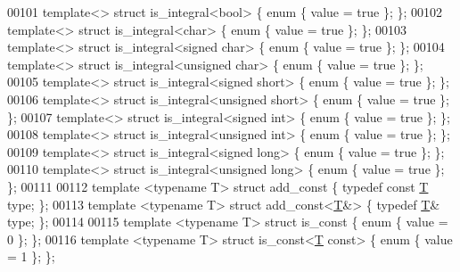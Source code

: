 \begin{DoxyCode}
00101 \textcolor{keyword}{template}<> \textcolor{keyword}{struct }is\_integral<bool>            \{ \textcolor{keyword}{enum} \{ value = \textcolor{keyword}{true} \}; \};
00102 \textcolor{keyword}{template}<> \textcolor{keyword}{struct }is\_integral<char>            \{ \textcolor{keyword}{enum} \{ value = \textcolor{keyword}{true} \}; \};
00103 \textcolor{keyword}{template}<> \textcolor{keyword}{struct }is\_integral<signed char>     \{ \textcolor{keyword}{enum} \{ value = \textcolor{keyword}{true} \}; \};
00104 \textcolor{keyword}{template}<> \textcolor{keyword}{struct }is\_integral<unsigned char>   \{ \textcolor{keyword}{enum} \{ value = \textcolor{keyword}{true} \}; \};
00105 \textcolor{keyword}{template}<> \textcolor{keyword}{struct }is\_integral<signed short>    \{ \textcolor{keyword}{enum} \{ value = \textcolor{keyword}{true} \}; \};
00106 \textcolor{keyword}{template}<> \textcolor{keyword}{struct }is\_integral<unsigned short>  \{ \textcolor{keyword}{enum} \{ value = \textcolor{keyword}{true} \}; \};
00107 \textcolor{keyword}{template}<> \textcolor{keyword}{struct }is\_integral<signed int>      \{ \textcolor{keyword}{enum} \{ value = \textcolor{keyword}{true} \}; \};
00108 \textcolor{keyword}{template}<> \textcolor{keyword}{struct }is\_integral<unsigned int>    \{ \textcolor{keyword}{enum} \{ value = \textcolor{keyword}{true} \}; \};
00109 \textcolor{keyword}{template}<> \textcolor{keyword}{struct }is\_integral<signed long>     \{ \textcolor{keyword}{enum} \{ value = \textcolor{keyword}{true} \}; \};
00110 \textcolor{keyword}{template}<> \textcolor{keyword}{struct }is\_integral<unsigned long>   \{ \textcolor{keyword}{enum} \{ value = \textcolor{keyword}{true} \}; \};
00111 
00112 \textcolor{keyword}{template} <\textcolor{keyword}{typename} T> \textcolor{keyword}{struct }add\_const \{ \textcolor{keyword}{typedef} \textcolor{keyword}{const} \hyperlink{group___sparse_core___module_class_eigen_1_1_triplet}{T} type; \};
00113 \textcolor{keyword}{template} <\textcolor{keyword}{typename} T> \textcolor{keyword}{struct }add\_const<\hyperlink{group___sparse_core___module_class_eigen_1_1_triplet}{T}&> \{ \textcolor{keyword}{typedef} \hyperlink{group___sparse_core___module_class_eigen_1_1_triplet}{T}& type; \};
00114 
00115 \textcolor{keyword}{template} <\textcolor{keyword}{typename} T> \textcolor{keyword}{struct }is\_const \{ \textcolor{keyword}{enum} \{ value = 0 \}; \};
00116 \textcolor{keyword}{template} <\textcolor{keyword}{typename} T> \textcolor{keyword}{struct }is\_const<\hyperlink{group___sparse_core___module_class_eigen_1_1_triplet}{T} const> \{ \textcolor{keyword}{enum} \{ value = 1 \}; \};

\end{DoxyCode}
